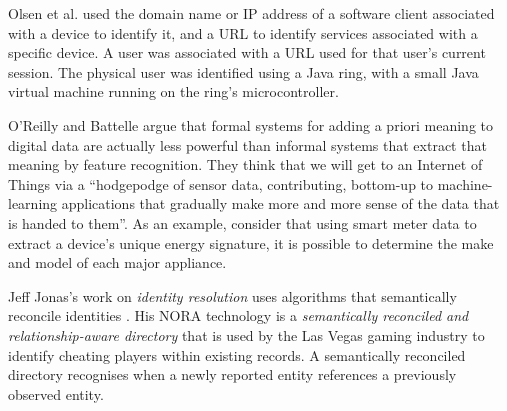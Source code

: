 Olsen et al. \cite{Olsen2001} used the domain name or IP address of a software client associated with a device to identify it, and a URL to identify services associated with a specific device. A user was associated with a URL used for that user's current session. The physical user was identified using a Java ring, with a small Java virtual machine running on the ring's microcontroller. 




O'Reilly and Battelle \cite{OReilly2009} argue that formal systems for adding a priori meaning to digital data are actually less powerful than informal systems that extract that meaning by feature recognition. They think that we will get to an Internet of Things via a ``hodgepodge of sensor data, contributing, bottom-up to machine-learning applications that gradually make more and more sense of the data that is handed to them''. As an example, consider that using smart meter data to extract a device's unique energy signature, it is possible to determine the make and model of each major appliance.

Jeff Jonas's work on \emph{identity resolution} uses algorithms that semantically reconcile identities \cite{Segaran2009}. His \ac{NORA} technology is a \emph{semantically reconciled and relationship-aware directory} that is used by the Las Vegas gaming industry to identify cheating players within existing records. A semantically reconciled directory recognises when a newly reported entity references a previously observed entity.


